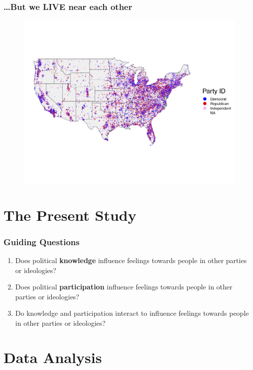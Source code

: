 \documentclass[14pt]{beamer}
\newcommand\tb{\textbf}
\begin{document}
\begin{frame}
\frametitle{\ldots But we LIVE near each other}
\begin{center}
	\begin{figure}[ht!]  
		{	 \includegraphics[width=\textwidth]{USMap}}
	\end{figure}
\end{center}
\end{frame}

\section{The Present Study}

\begin{frame}
\frametitle{Guiding Questions}
\begin{enumerate}
	\item Does political \tb{knowledge} influence feelings towards people in other parties or ideologies?
	\item Does political \tb{participation} influence feelings towards people in other parties or ideologies?
	\item Do knowledge and participation interact to influence feelings towards people in other parties or ideologies?
\end{enumerate}
\end{frame}


\section{Data Analysis}
\end{document}
